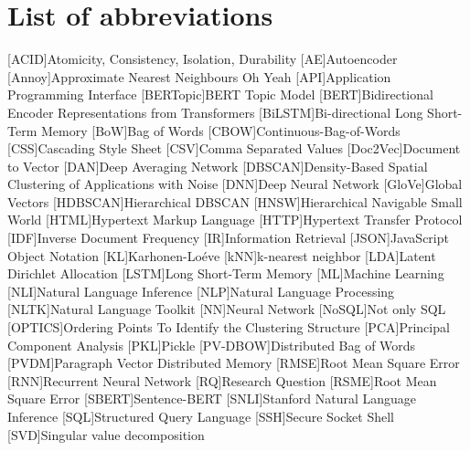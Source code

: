 \chapter*{List of abbreviations}

\begin{acronym}[XXXXXXXXX]
    [ACID]{Atomicity, Consistency, Isolation, Durability}
    [AE]{Autoencoder}
    [Annoy]{Approximate Nearest Neighbours Oh Yeah}
    [API]{Application Programming Interface}
    [BERTopic]{BERT Topic Model}
    [BERT]{Bidirectional Encoder Representations from Transformers}
    [BiLSTM]{Bi-directional Long Short-Term Memory}
    [BoW]{Bag of Words}
    [CBOW]{Continuous-Bag-of-Words}
    [CSS]{Cascading Style Sheet}
    [CSV]{Comma Separated Values}
    [Doc2Vec]{Document to Vector}
    [DAN]{Deep Averaging Network}
    [DBSCAN]{Density-Based Spatial Clustering of Applications with Noise}
    [DNN]{Deep Neural Network}
    [GloVe]{Global Vectors}
    [HDBSCAN]{Hierarchical DBSCAN}
    [HNSW]{Hierarchical Navigable Small World}
    [HTML]{Hypertext Markup Language}
    [HTTP]{Hypertext Transfer Protocol}
    [IDF]{Inverse Document Frequency}
    [IR]{Information Retrieval}
    [JSON]{JavaScript Object Notation}
    [KL]{Karhonen-Loéve}
    [kNN]{k-nearest neighbor}
    [LDA]{Latent Dirichlet Allocation}
    [LSTM]{Long Short-Term Memory}
    [ML]{Machine Learning}
    [NLI]{Natural Language Inference}
    [NLP]{Natural Language Processing}
    [NLTK]{Natural Language Toolkit}
    [NN]{Neural Network}
    [NoSQL]{Not only SQL}
    [OPTICS]{Ordering Points To Identify the Clustering Structure}
    [PCA]{Principal Component Analysis}
    [PKL]{Pickle}
    [PV-DBOW]{Distributed Bag of Words}
    [PVDM]{Paragraph Vector Distributed Memory}
    [RMSE]{Root Mean Square Error}
    [RNN]{Recurrent Neural Network}
    [RQ]{Research Question}
    [RSME]{Root Mean Square Error}
    [SBERT]{Sentence-BERT}
    [SNLI]{Stanford Natural Language Inference}
    [SQL]{Structured Query Language}
    [SSH]{Secure Socket Shell}
    [SVD]{Singular value decomposition}

\end{acronym}
